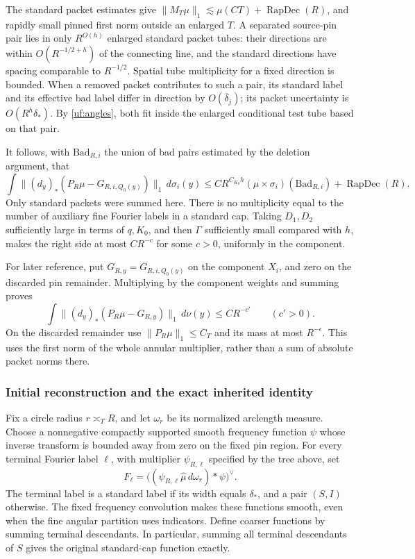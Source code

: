 The standard packet estimates give
\(\|M_T\mu\|_1\lesssim\mu(CT)+\operatorname{RapDec}(R)\),
and rapidly small pinned first norm outside an enlarged \(T\).
A separated source-pin pair lies in only \(R^{O(h)}\) enlarged
standard packet tubes: their directions are within
\(O(R^{-1/2+h})\) of the connecting line, and the standard directions
have spacing comparable to \(R^{-1/2}\). Spatial tube multiplicity
for a fixed direction is bounded. When a removed packet contributes to
such a pair, its standard label and its effective bad label differ in
direction by \(O(\overline\delta_j)\); its packet uncertainty is
\(O(R^h\delta_*)\). By \eqref{uf:angles}, both fit inside the enlarged
conditional test tube based on that pair.

It follows, with \(\mathrm{Bad}_{R,i}\) the union of bad pairs estimated
by the deletion argument, that
\begin{equation}\label{fprof:badL1}
 \int\|(d_y)_*(P_R\mu-G_{R,i,Q_0(y)})\|_1\,d\sigma_i(y)
 \leq C R^{C_{K_0}h}(\mu\times\sigma_i)(\mathrm{Bad}_{R,i})
       +\operatorname{RapDec}(R).
\end{equation}
Only standard packets were summed here. There is no multiplicity equal
to the number of auxiliary fine Fourier labels in a standard cap.
Taking \(D_1,D_2\) sufficiently large in terms of \(q,K_0\), and then
\(\Gamma\) sufficiently small compared with \(h\), makes the right
side at most \(CR^{-c}\) for some \(c>0\), uniformly in the component.

For later reference, put \(G_{R,y}=G_{R,i,Q_0(y)}\) on the component
\(X_i\), and zero on the discarded pin remainder. Multiplying by the
component weights and summing proves
\begin{equation}\label{uf:jointL1}
 \int\|(d_y)_*(P_R\mu-G_{R,y})\|_1\,d\nu(y)\leq CR^{-c'}
 \qquad(c'>0).
\end{equation}
On the discarded remainder use \(\|P_R\mu\|_1\leq C_T\) and its
mass at most \(R^{-\epsilon}\). This uses the first norm of the whole
annular multiplier, rather than a sum of absolute packet norms there.

\subsubsection*{Initial reconstruction and the exact inherited identity}

Fix a circle radius \(r\asymp_T R\), and let \(\omega_r\) be its
normalized arclength measure. Choose a nonnegative compactly supported
smooth frequency function \(\psi\) whose inverse transform is bounded
away from zero on the fixed pin region. For every terminal Fourier
label \(\ell\), with multiplier \(\psi_{R,\ell}\) specified by the
tree above, set
$$
 F_\ell=\big((\psi_{R,\ell}\widehat\mu\,d\omega_r)*\psi\big)^\vee.
$$
The terminal label is a standard label if its width equals
\(\delta_*\), and a pair \((S,I)\) otherwise. The fixed frequency
convolution makes these functions smooth, even when the fine angular
partition uses indicators. Define coarser functions by summing terminal
descendants. In particular, summing all terminal descendants of \(S\)
gives the original standard-cap function exactly.

